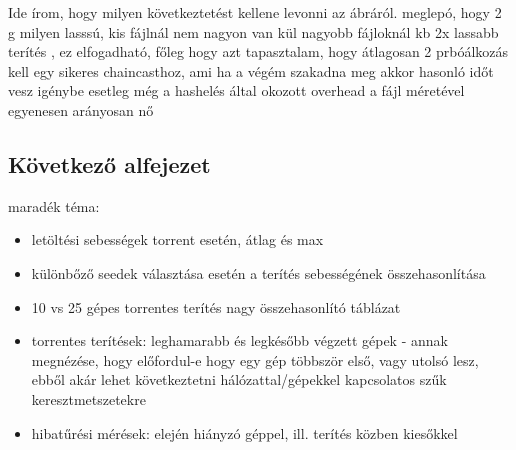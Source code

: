 Ide írom, hogy milyen következtetést kellene levonni az ábráról.
meglepó, hogy 2 g milyen lasssú, kis fájlnál nem nagyon van kül
nagyobb fájloknál kb 2x lassabb terítés , ez elfogadható, főleg hogy azt tapasztalam, hogy átlagosan 2 prbóálkozás kell egy sikeres chaincasthoz, ami ha a végém szakadna meg akkor hasonló időt vesz igénybe
esetleg még a hashelés által okozott overhead a fájl méretével egyenesen arányosan nő



\subsection{Következő alfejezet}

maradék téma:
\begin{itemize}
  \item letöltési sebességek torrent esetén, átlag és max
  \item különbőző seedek választása esetén a terítés sebességének összehasonlítása
  \item 10 vs 25 gépes torrentes terítés nagy összehasonlító táblázat
  \item torrentes terítések: leghamarabb és legkésőbb végzett gépek - annak megnézése, hogy előfordul-e hogy egy gép többször első, vagy utolsó lesz, ebből akár lehet következtetni hálózattal/gépekkel kapcsolatos szűk keresztmetszetekre
  \item hibatűrési mérések: elején hiányzó géppel, ill. terítés közben kiesőkkel
\end{itemize}

